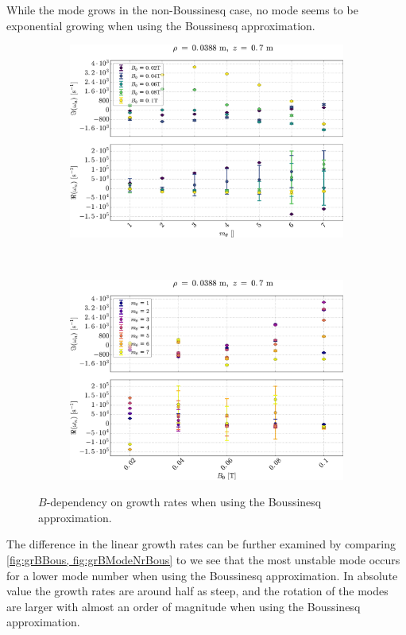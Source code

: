%
While the  mode grows in the non-Boussinesq case, no mode seems to be exponential growing when using the Boussinesq approximation.
%
\begin{figure}[h]
    \centering
    \begin{subfigure}[h]{0.5\textwidth}
        \centering
        \includegraphics[width=1.0\textwidth]{fig/results/compareBouss/growthRatesB0Bous}
        \label{fig:grBBous}
    \end{subfigure}%
    \\
    \begin{subfigure}[h]{0.50\textwidth}
        \centering
        \includegraphics[width=1.0\textwidth]{fig/results/compareBouss/growthRatesB0ModeNr}
        \label{fig:grBModeNrBous}
    \end{subfigure}
    \caption{$B$-dependency on growth rates when using the Boussinesq approximation.}
\end{figure}
%
The difference in the linear growth rates can be further examined by comparing \cref{fig:grBBous, fig:grBModeNrBous} to
we see that the most unstable mode occurs for a lower mode number when using the Boussinesq approximation.
In absolute value the growth rates are around half as steep, and the rotation of the modes are larger with almost an order of magnitude when using the Boussinesq approximation.

